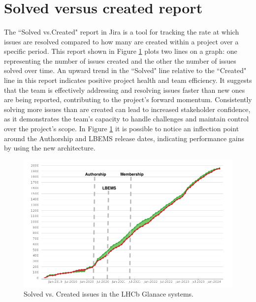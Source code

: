 \section{Solved versus created report}
\paragraph{} The ``Solved vs.Created" report in Jira is a tool for tracking the rate at which issues are resolved compared to how many are created within a project over a specific period. This report shown in Figure \ref{fig:number_of_issues} plots two lines on a graph: one representing the number of issues created and the other the number of issues solved over time. An upward trend in the ``Solved" line relative to the ``Created" line in this report indicates positive project health and team efficiency. It suggests that the team is effectively addressing and resolving issues faster than new ones are being reported, contributing to the project's forward momentum. Consistently solving more issues than are created can lead to increased stakeholder confidence, as it demonstrates the team's capacity to handle challenges and maintain control over the project's scope. In Figure \ref{fig:number_of_issues} it is possible to notice an inflection point around the Authorship and LBEMS release dates, indicating performance gains by using the new architecture.

\begin{figure}[H]
    \centering
    \includegraphics[width=0.7\linewidth]{figuras/number_of_issues_2.png}
    \caption{Solved vs. Created issues in the LHCb Glanace systems.}
    \label{fig:number_of_issues}
\end{figure}

